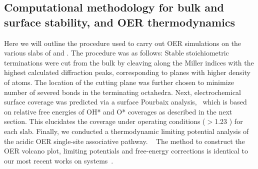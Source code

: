 \subsection{Computational methodology for bulk and surface stability, and OER thermodynamics}
%
%
Here we will outline the procedure used to carry out OER simulations on the various slabs of \IrOtwo and \IrOthree.
%
The procedure was as follows:
%
Stable stoichiometric terminations were cut from the bulk by cleaving along the Miller indices with the highest calculated diffraction peaks, corresponding to planes with higher density of atoms.
%
The location of the cutting plane was further chosen to minimize number of severed bonds in the terminating octahedra.
%
Next, electrochemical surface coverage was predicted via a surface Pourbaix analysis,~\cite{Lu2017}
which is based on relative free energies of OH* and O* coverages as described in the next section.
%
This elucidates the coverage under operating conditions ($>$\num{1.23} \VRHE) for each slab.
%
Finally, we conducted a thermodynamic limiting potential analysis of the acidic OER single-site associative pathway.
~\cite{Rossmeisl2007,Man2011,Friebel2015,Seitz2016,Strickler2019}
%
The method to construct the OER volcano plot, limiting potentials and free-energy corrections is identical to our most recent works on \IrOtwo systems~\cite{Strickler2019}.


